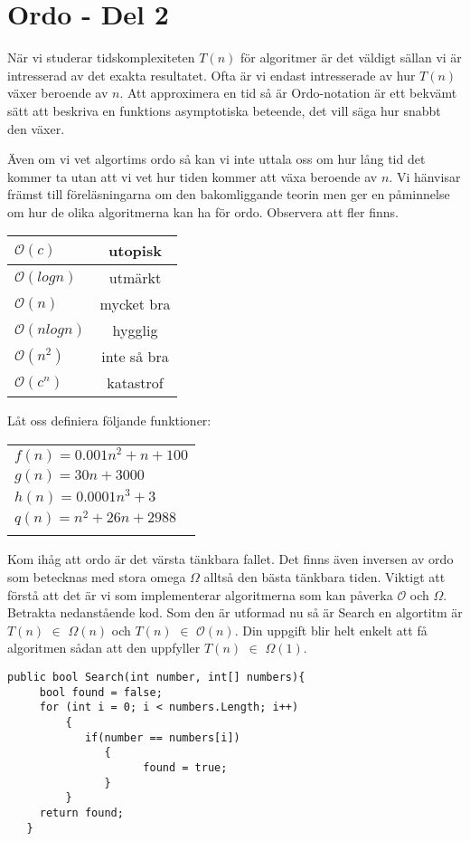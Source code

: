 \documentclass{article}
\begin{document}
  
   \section*{Ordo - Del 2
    }
  
  När vi studerar tidskomplexiteten $T(n)$ för algoritmer är det väldigt sällan vi är intresserad av det exakta resultatet. Ofta är vi endast intresserade av hur $T(n)$ växer beroende av $n$. Att approximera en tid så är Ordo-notation är ett bekvämt sätt att beskriva en funktions asymptotiska beteende, det vill säga hur snabbt den växer.
  
Även om vi vet algortims ordo så kan vi inte uttala oss om hur lång tid det kommer ta utan att vi vet hur tiden kommer att växa beroende av $n$. Vi hänvisar främst till föreläsningarna om den bakomliggande teorin men ger en påminnelse om hur de olika algoritmerna kan ha för ordo. Observera att fler finns. 
  
  \begin{center}
    \begin{tabular}{| l | c |}
      \hline
      \texttt{$\mathcal{O}(c)$} & utopisk\\ \hline
      \texttt{$\mathcal{O}(log n)$} & utmärkt \\ \hline
      \texttt{$\mathcal{O}(n)$} & mycket bra\\ \hline
      \texttt{$\mathcal{O}(n log n)$} & hygglig \\ \hline
      \texttt{$\mathcal{O}(n^2)$} & inte så bra \\ \hline
      \texttt{$\mathcal{O}(c^n)$} & katastrof \\
      \hline
    \end{tabular}
  \end{center}
  Låt oss definiera följande funktioner: \\
 \begin{center}
 \begin{tabular}{ l }
	$f(n) = 0.001n^2 + n + 100$ \\
	$g(n) = 30n + 3000$\\
	$h(n) = 0.0001n^3 + 3$\\
	$q(n) = n^2 + 26n + 2988$\\\\
	\end{tabular}
 \end{center} 
  Kom ihåg att ordo är det värsta tänkbara fallet. Det finns även inversen av ordo som betecknas med stora omega $\Omega$ alltså den bästa tänkbara tiden. Viktigt att förstå att det är vi som implementerar algoritmerna som kan påverka $\mathcal{O}$ och $\Omega$. Betrakta nedanstående kod. Som den är utformad nu så är Search en algortitm är  $T(n)$ $\in$ $\Omega  (n)$ och $T(n)$ $\in$ $\mathcal{O}(n)$. Din uppgift blir helt enkelt att få algoritmen sådan att den uppfyller  $T(n)$ $\in$ $\Omega(1)$.
  \begin{lstlisting}
public bool Search(int number, int[] numbers){
     bool found = false;
     for (int i = 0; i < numbers.Length; i++)
         { 
            if(number == numbers[i])
               {
                     found = true;
               }
         }
     return found; 
   }
   \end{lstlisting}
  
\end{document}
